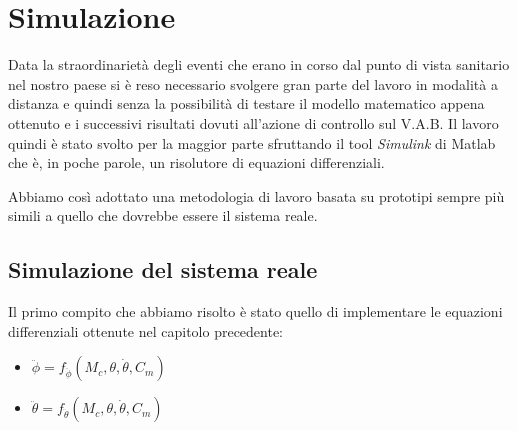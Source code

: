 \chapter{Simulazione}
Data la straordinarietà degli eventi che erano in corso dal punto di vista sanitario nel nostro paese si è reso necessario svolgere gran parte del lavoro in modalità a distanza e quindi senza la possibilità di testare il modello matematico appena ottenuto e i successivi risultati dovuti all'azione di controllo sul V.A.B. Il lavoro quindi è stato svolto per la maggior parte sfruttando il tool \textit{Simulink} di Matlab che è, in poche parole, un risolutore di equazioni differenziali.

Abbiamo così adottato una metodologia di lavoro basata su prototipi sempre più simili a quello che dovrebbe essere il sistema reale.
\section{Simulazione del sistema reale}
Il primo compito che abbiamo risolto è stato quello di implementare le equazioni differenziali ottenute nel capitolo precedente:
\begin{itemize}
	\item $\ddot{\phi} = f_{\ddot{\phi}} (M_c,\theta,\dot{\theta},C_m)$
	\item $\ddot{\theta} = f_{\ddot{\theta}} (M_c,\theta,\dot{\theta},C_m)$
\end{itemize}


